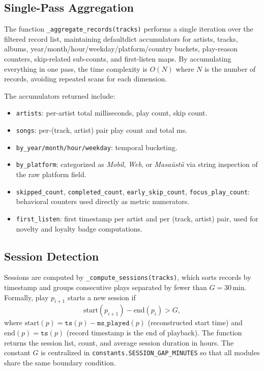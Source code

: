 \documentclass[conference]{IEEEtran}
\begin{document}
\subsection{Single-Pass Aggregation}

The function \texttt{\_aggregate\_records(tracks)} performs a single
iteration over the filtered record list, maintaining defaultdict accumulators
for artists, tracks, albums, year/month/hour/weekday/platform/country
buckets, play-reason counters, skip-related sub-counts, and first-listen
maps. By accumulating everything in one pass, the time complexity is
$O(N)$ where $N$ is the number of records, avoiding repeated scans for
each dimension.

The accumulators returned include:
\begin{itemize}
  \item \texttt{artists}: per-artist total milliseconds, play count, skip count.
  \item \texttt{songs}: per-(track, artist) pair play count and total ms.
  \item \texttt{by\_year/month/hour/weekday}: temporal bucketing.
  \item \texttt{by\_platform}: categorized as \textit{Mobil}, \textit{Web},
        or \textit{Masaüstü} via string inspection of the raw platform field.
  \item \texttt{skipped\_count}, \texttt{completed\_count},
        \texttt{early\_skip\_count}, \texttt{focus\_play\_count}: behavioral
        counters used directly as metric numerators.
  \item \texttt{first\_listen}: first timestamp per artist and per
        (track, artist) pair, used for novelty and loyalty badge computations.
\end{itemize}

\subsection{Session Detection}

Sessions are computed by \texttt{\_compute\_sessions(tracks)}, which
sorts records by timestamp and groups consecutive plays separated by fewer
than $G = 30$\,min. Formally, play $p_{i+1}$ starts a new session if
\begin{equation}
  \mathrm{start}(p_{i+1}) - \mathrm{end}(p_i) > G,
\end{equation}
where $\mathrm{start}(p) = \texttt{ts}(p) - \texttt{ms\_played}(p)$
(reconstructed start time) and $\mathrm{end}(p) = \texttt{ts}(p)$
(record timestamp is the end of playback). The function returns the session
list, count, and average session duration in hours. The constant $G$ is
centralized in \texttt{constants.SESSION\_GAP\_MINUTES} so that all
modules share the same boundary condition.
\end{document}
